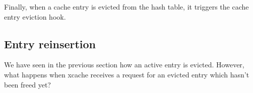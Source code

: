 Finally, when a cache entry is evicted from the hash table, it triggers the 
cache entry eviction hook.

\begin{comment}
\begin{itemize}
	\item Insert a new entry to the LRU list
	\item Evict the LRU entry
	\item Update an entry's access time (i.e. mark it as MRU)
	\item Remove an arbitrary entry
\end{itemize}

Lets explain these fields a bit:

\begin{description}
	\item[lru:] Obviously, it's the least recently used entry. It can be 
		considered as the one end of the doubly linked list.
	\item[mru:] The entry that has just been used. It can be considered as 
		the other end of the doubly-linked list
	\item[younger:] This entry-specific field points to an entry used right 
		after our entry was used.
	\item[older:] Same as "younger", it points to the entry that has been 
		used right before our entry was used.
\end{description}

Finally, as we have explained in Section \ref{sec:xcache-evict-design}, the 
eviction internals should normally not bother the user. However, if the user 
wants to, \xcache exposes the following functions:

\begin{description}
	\item[xcache\_evict\_lru:] The name says it all, it evicts the recently 
		used item.
	\item[xcache\_peek\_and\_get\_lru:] This function allows the user to 
		atomically take a peek on the Least Recently Used entry and also 
		update its refcount.
\end{description}
\end{comment}

\subsection{Entry reinsertion}

We have seen in the previous section how an active entry is evicted. However, 
what happens when xcache receives a request for an evicted entry which hasn't 
been freed yet? 

